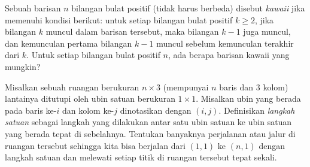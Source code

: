 \documentclass[12pt]{scrartcl}
\begin{document}
\begin{soaljawab}
    Sebuah barisan $n$ bilangan bulat positif (tidak harus berbeda) disebut \textit{kawaii} jika memenuhi kondisi berikut: untuk setiap bilangan bulat positif $k \ge 2$, jika bilangan $k$ muncul dalam barisan tersebut, maka bilangan $k-1$ juga muncul, dan kemunculan pertama bilangan $k-1$ muncul sebelum kemunculan terakhir dari $k$. Untuk setiap bilangan bulat positif $n$, ada berapa barisan kawaii yang mungkin?
\end{soaljawab}

\begin{soaljawab}
    Misalkan sebuah ruangan berukuran $n \times 3$ (mempunyai $n$ baris dan $3$ kolom) lantainya ditutupi oleh ubin satuan berukuran $1 \times 1$. Misalkan ubin yang berada pada baris ke-$i$ dan kolom ke-$j$ dinotasikan dengan $(i,j)$. Definisikan \textit{langkah satuan} sebagai langkah yang dilakukan antar satu ubin satuan ke ubin satuan yang berada tepat di sebelahnya. Tentukan banyaknya perjalanan atau jalur di ruangan tersebut sehingga kita bisa berjalan dari $(1,1)$ ke $(n,1)$ dengan langkah satuan dan melewati setiap titik di ruangan tersebut tepat sekali.
\end{soaljawab}
\end{document}
